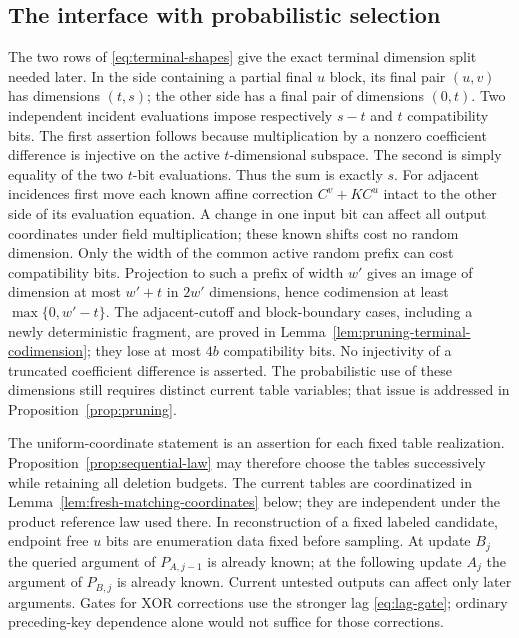 \subsection{The interface with probabilistic selection}

\begin{remark}\label{rem:terminal-dimensions}
The two rows of \eqref{eq:terminal-shapes} give the exact terminal
dimension split needed later.  In the side containing a partial final
$u$ block, its final pair $(u,v)$ has dimensions $(t,s)$; the other side
has a final pair of dimensions $(0,t)$.  Two independent incident
evaluations impose respectively $s-t$ and $t$ compatibility bits.
The first assertion follows because multiplication by a nonzero
coefficient difference is injective on the active $t$-dimensional
subspace.  The second is simply equality of the two $t$-bit evaluations.
Thus the sum is exactly $s$.  For adjacent incidences first move each
known affine correction $C^v+K C^u$ intact to the other side of its
evaluation equation.  A change in one input bit can affect all output
coordinates under field multiplication; these known shifts cost no
random dimension.  Only the width of the common active random prefix
can cost compatibility bits.  Projection to such a prefix of width
$w'$ gives an image of dimension at most $w'+t$ in $2w'$ dimensions,
hence codimension at least $\max\{0,w'-t\}$.  The adjacent-cutoff and
block-boundary cases, including a newly deterministic fragment, are
proved in Lemma~\ref{lem:pruning-terminal-codimension}; they lose at
most $4b$ compatibility bits.  No injectivity of a truncated
coefficient difference is asserted.
The probabilistic use of these dimensions still requires distinct
current table variables; that issue is addressed in
Proposition~\ref{prop:pruning}.
\end{remark}

\begin{remark}\label{rem:label-interface}
The uniform-coordinate statement is an assertion for each fixed table
realization.  Proposition~\ref{prop:sequential-law} may therefore choose
the tables successively while retaining all deletion budgets.  The current
tables are coordinatized in
Lemma~\ref{lem:fresh-matching-coordinates} below; they are independent
under the product reference law used there.  In reconstruction of a
fixed labeled candidate, endpoint free $u$ bits are enumeration data
fixed before sampling.  At update $B_j$ the queried argument of
$P_{A,j-1}$ is already known; at the following update $A_j$ the
argument of $P_{B,j}$ is already known.  Current untested outputs can
affect only later arguments.  Gates for XOR corrections use the
stronger lag \eqref{eq:lag-gate}; ordinary preceding-key dependence
alone would not suffice for those corrections.
\end{remark}
